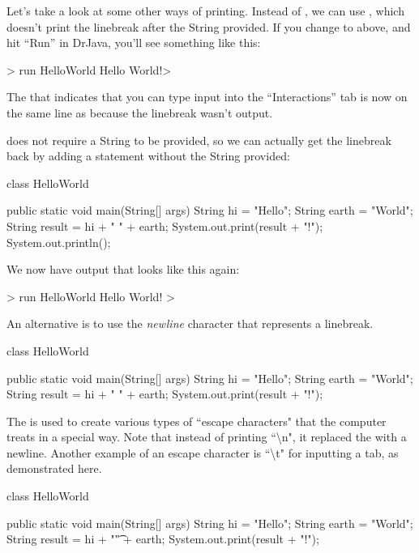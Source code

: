 Let's take a look at some other ways of printing.
Instead of , we can use , which
doesn't print the linebreak after the String provided.
If you change  to  above, and hit
``Run'' in DrJava, you'll see something like this:
\begin{code}
> run HelloWorld
Hello World!>
\end{code}
The \ic{>} that indicates that you can type input into the ``Interactions''
tab is now on the same line as  because the linebreak
wasn't output.

 does not require a String to be provided,
so we can actually get the linebreak back by adding a
 statement without the String provided:
\begin{code}
class HelloWorld {

    public static void main(String[] args) {
        String hi = "Hello";
        String earth = "World";
        String result = hi + " " + earth;
        System.out.print(result + "!");
        System.out.println();
    }

}
\end{code}
We now have output that looks like this again:
\begin{code}
> run HelloWorld
Hello World!
>
\end{code}

An alternative is to use the \emph{newline} character  that represents a
linebreak. 
\begin{code}
class HelloWorld {

    public static void main(String[] args) {
        String hi = "Hello";
        String earth = "World";
        String result = hi + " " + earth;
        System.out.print(result + "!\n");
    }

}
\end{code}

The \ic{\textbackslash} is used to create various types of ``escape characters" that the computer treats in a special way. Note that instead of printing ``\textbackslash n", it replaced the  with a newline. Another example of an escape character is ``\textbackslash t" for inputting a tab, as demonstrated here. 

\begin{code}
class HelloWorld {

    public static void main(String[] args) {
        String hi = "Hello";
        String earth = "World";
        String result = hi + "\t" + earth;
        System.out.print(result + "!\n");
    }

}
\end{code}

